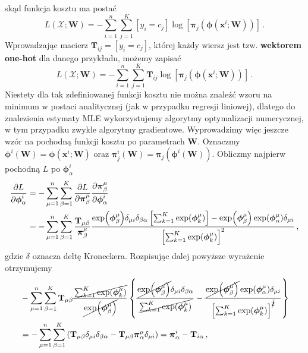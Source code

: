 \documentclass{myclass}
\numberwithin{equation}{section}
\begin{document}
skąd funkcja kosztu ma postać
\begin{equation}
    L(\mathcal{X}; \mathbf{W}) = - \sum_{i=1}^n \sum_{j=1}^K [y_i = c_j] \log \left[ \boldsymbol{\pi}_j\left(\boldsymbol{\phi}(\mathbf{x}^i; \mathbf{W})\right)\right]\,.
\end{equation}
Wprowadzając macierz \(\mathbf{T}_{ij} = [y_i = c_j]\), której każdy wiersz jest tzw.
\textbf{wektorem one-hot} dla danego przykładu, możemy zapisać
\begin{equation}\boxed{
    L(\mathcal{X}; \mathbf{W}) = - \sum_{i=1}^n \sum_{j=1}^K \mathbf{T}_{ij} \log \left[ \boldsymbol{\pi}_j\left(\boldsymbol{\phi}(\mathbf{x}^i; \mathbf{W})\right)\right]\,.
}\end{equation}
Niestety dla tak zdefiniowanej funkcji kosztu nie można znaleźć wzoru na minimum w postaci
analitycznej (jak w przypadku regresji liniowej), dlatego do znalezienia estymaty MLE wykorzystujemy
algorytmy optymalizacji numerycznej, w tym przypadku zwykle algorytmy gradientowe. Wyprowadzimy więc
jeszcze wzór na pochodną funkcji kosztu po parametrach \(\mathbf{W}\). Oznaczmy
\(\boldsymbol{\phi}^i(\mathbf{W}) = \boldsymbol{\phi}(\mathbf{x}^i; \mathbf{W})\) oraz
\(\boldsymbol{\pi}_j^i(\mathbf{W}) = \boldsymbol{\pi}_j(\boldsymbol{\phi}^i(\mathbf{W}))\). Obliczmy
najpierw pochodną \(L\) po \(\boldsymbol{\phi}^i_\alpha\)
\begin{equation}
    \begin{split}
        \pdv{L}{\boldsymbol{\phi}^i_\alpha} &= -\sum_{\mu=1}^n\sum_{\beta=1}^K \pdv{L}{\boldsymbol{\pi}_\beta^\mu}\pdv{\boldsymbol{\pi}_\beta^\mu}{\boldsymbol{\phi}^i_\alpha}\\
        &= -\sum_{\mu=1}^n\sum_{\beta=1}^K \frac{\mathbf{T}_{\mu\beta}}{\boldsymbol{\pi}_\beta^\mu} \frac{\exp(\boldsymbol{\phi}_\beta^\mu)\delta_{\mu i}\delta_{\beta \alpha} \left[\sum_{k=1}^K \exp(\boldsymbol{\phi}_k^\mu)\right] - \exp(\boldsymbol{\phi}_\beta^\mu) \exp(\boldsymbol{\phi}^\mu_\alpha) \delta_{\mu i}}{\left[\sum_{k=1}^K \exp(\boldsymbol{\phi}_k^\mu)\right]^2}\,,
    \end{split}
\end{equation}
gdzie \(\delta\) oznacza deltę Kroneckera. Rozpisując dalej powyższe wyrażenie otrzymujemy
\begin{equation}
    \begin{split}
        &-\sum_{\mu=1}^n\sum_{\beta=1}^K \mathbf{T}_{\mu\beta} \frac{\cancel{\sum_{k=1}^K \exp(\boldsymbol{\phi}^\mu_k)}}{\cancel{\exp(\boldsymbol{\phi}^\mu_\beta)}} \left\{\frac{\cancel{\exp(\boldsymbol{\phi}_\beta^\mu)}\delta_{\mu i}\delta_{\beta \alpha}}{\cancel{\sum_{k=1}^K \exp(\boldsymbol{\phi}_k^\mu)}} - \frac{\cancel{\exp(\boldsymbol{\phi}_\beta^\mu)} \exp(\boldsymbol{\phi}^\mu_\alpha) \delta_{\mu i}}{\left[\sum_{k=1}^K \exp(\boldsymbol{\phi}_k^\mu)\right]^{\cancel{2}}}\right\}\\
        &= -\sum_{\mu=1}^n\sum_{\beta=1}^K \left(\mathbf{T}_{\mu\beta} \delta_{\mu i}\delta_{\beta\alpha} - \mathbf{T}_{\mu\beta}\boldsymbol{\pi}^\mu_\alpha\delta_{\mu i}\right) = \boldsymbol{\pi}_\alpha^i - \mathbf{T}_{i\alpha}\,,
    \end{split}
\end{equation}
\end{document}
